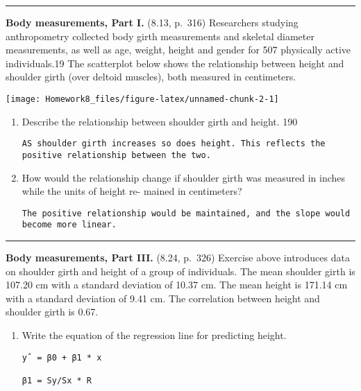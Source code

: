 \documentclass[]{article}
\begin{document}
\begin{center}\rule{0.5\linewidth}{\linethickness}\end{center}

\clearpage

\textbf{Body measurements, Part I.} (8.13, p.~316) Researchers studying
anthropometry collected body girth measurements and skeletal diameter
measurements, as well as age, weight, height and gender for 507
physically active individuals.19 The scatterplot below shows the
relationship between height and shoulder girth (over deltoid muscles),
both measured in centimeters.

\begin{center}

\texttt{[image: Homework8\_files/figure-latex/unnamed-chunk-2-1]} 
\end{center}

\begin{enumerate}
\def\labelenumi{(\alph{enumi})}
\item
  Describe the relationship between shoulder girth and height. 190

\begin{verbatim}
AS shoulder girth increases so does height. This reflects the positive relationship between the two.
\end{verbatim}
\item
  How would the relationship change if shoulder girth was measured in
  inches while the units of height re- mained in centimeters?

\begin{verbatim}
The positive relationship would be maintained, and the slope would become more linear.
\end{verbatim}
\end{enumerate}

\begin{center}\rule{0.5\linewidth}{\linethickness}\end{center}

\clearpage

\textbf{Body measurements, Part III.} (8.24, p.~326) Exercise above
introduces data on shoulder girth and height of a group of individuals.
The mean shoulder girth is 107.20 cm with a standard deviation of 10.37
cm. The mean height is 171.14 cm with a standard deviation of 9.41 cm.
The correlation between height and shoulder girth is 0.67.

\begin{enumerate}
\def\labelenumi{(\alph{enumi})}
\item
  Write the equation of the regression line for predicting height.

\begin{verbatim}
yˆ = β0 + β1 * x

β1 = Sy/Sx * R
\end{verbatim}
\end{enumerate}
\end{document}
